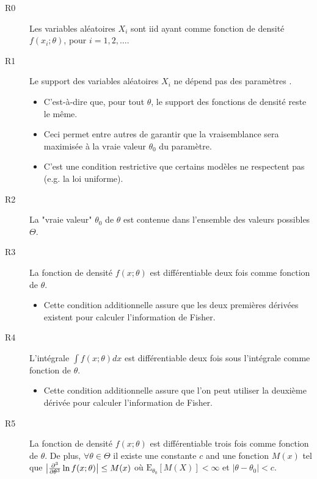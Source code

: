 \documentclass[10pt, french]{article}
\begin{document}
\begin{multicols*}{2}
\begin{definitionNOHFILLprop}
\begin{description}
	\item[R0]	Les variables aléatoires $X_{i}$ sont iid ayant comme fonction de densité $f(x_{i}; \theta)$, pour $i	=	1, 2, \dots$.
	\item[R1]	Le support des variables aléatoires $X_{i}$ ne dépend pas des paramètres .
		\begin{itemize}
		\item	C'est-à-dire que, pour tout $\theta$, le support des fonctions de densité reste le même.
		\item	Ceci permet entre autres de garantir que la vraisemblance sera maximisée à la vraie valeur $\theta_{0}$ du paramètre.
		\item	C'est une condition restrictive que certains modèles ne respectent pas (e.g. la loi uniforme).
		\end{itemize}
	\item[R2]	La "vraie valeur" $\theta_{0}$ de $\theta$ est contenue dans l'ensemble des valeurs possibles $\Theta$.
\end{description}
\tcbline
\begin{description}
	\item[R3]	La fonction de densité $f(x; \theta)$ est différentiable deux fois comme fonction de $\theta$.
		\begin{itemize}
		\item	Cette condition additionnelle assure que les deux premières dérivées existent pour calculer l'information de Fisher.
		\end{itemize}
	\item[R4]	L'intégrale $\int f(x; \theta) dx$ est différentiable deux fois sous l'intégrale comme fonction de $\theta$.
		\begin{itemize}
		\item	Cette condition additionnelle assure que l'on peut utiliser la deuxième dérivée pour calculer l'information de Fisher.
		\end{itemize}
\end{description}
\tcbline
\begin{description}
	\item[R5]	La fonction de densité $f(x; \theta)$ est différentiable trois fois comme fonction de $\theta$. De plus, $\forall \theta \in \Theta$ il existe une constante $c$ and une fonction $M(x)$ tel que $\big| \deriv[3]{\theta}{} \ln f(x; \theta) \big| \leq M(x)$ où $\text{E}_{\theta_{0}}[M(X)] < \infty$ et $|\theta - \theta_{0}| < c$.

\end{description}
\end{definitionNOHFILLprop}
\end{multicols*}
\end{document}
